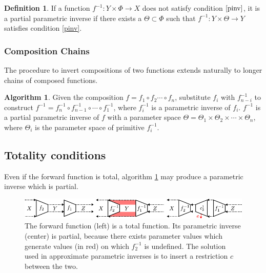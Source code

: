 \documentclass{sciposter}
\theoremstyle{definition} %
\newtheorem{definition}{Definition}
\newtheorem{algowizm}{Algorithm}
\begin{document}
\begin{multicols}{3}
\begin{definition}If a function $f^{-1}:Y \times \Phi \to X$ does not satisfy condition $\ref{pinv}$, it is a partial parametric inverse if there exists a $\Theta \subset \Phi$ such that $f^{-1}:Y \times \Theta \to Y$ satisfies condition \ref{pinv}.
\end{definition}

\subsubsection{Composition Chains}
The procedure to invert compositions of two functions extends naturally to longer chains of composed functions.

\begin{algowizm}
\label{algo:compinversion}
Given the composition $f = f_1 \circ f_2 \cdots \circ f_n$, substitute $f_i$ with $f^{-1}_{n-i}$ to construct $f^{-1} = f^{-1}_n \circ f^{-1}_{n-1} \circ \cdots \circ f^{-1}_1$, where $f^{-1}_i$ is a parametric inverse of $f_i$.
$f^{-1}$ is a partial parametric inverse of $f$ with a parameter space $\Theta = \Theta_1 \times \Theta_2 \times \cdots \times \Theta_n$, where $\Theta_i$ is the parameter space of primitive $f^{-1}_i$.
\end{algowizm}

\subsection{Totality conditions}
Even if the forward function is total, algorithm \ref{algo:compinversion} may produce a parametric inverse which is partial.

\begin{figure}[!htb]
\centering
\includegraphics[width=\linewidth]{partialapprox.pdf}
\caption{The forward function (left) is a total function. Its parametric inverse (center) is partial, because there exists parameter values which generate values (in red) on which $f^{-1}_2$ is undefined. The solution used in approximate parametric inverses is to insert a restriction $c$ between the two.}\label{fig:partial}
\end{figure}



\end{multicols}
\end{document}
